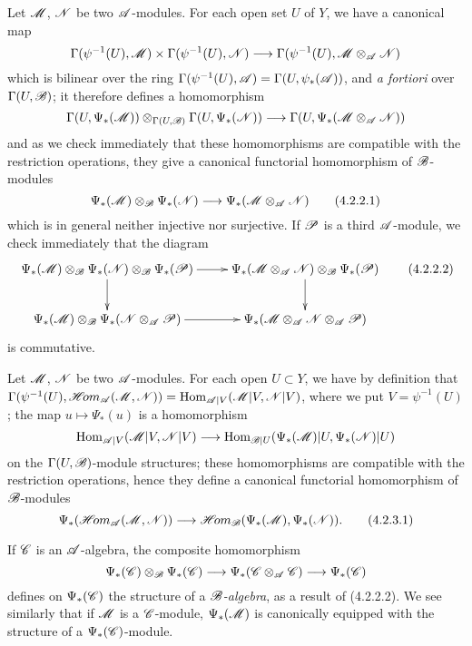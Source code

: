 \begin{env}[4.2.2]
\label{0.4.2.2}
Let $\mathscr{M}$, $\mathscr{N}$ be two $\mathscr{A}$-modules. For each open set $U$ of $Y$, we
have a canonical map
\[
  \Gamma(\psi^{-1}(U),\mathscr{M})\times\Gamma(\psi^{-1}(U),\mathscr{N})
  \longrightarrow\Gamma(\psi^{-1}(U),\mathscr{M}\otimes_\mathscr{A}\mathscr{N})
\]
which is bilinear over the ring
$\Gamma(\psi^{-1}(U),\mathscr{A})=\Gamma(U,\psi_*(\mathscr{A}))$, and \emph{a fortiori}
over $\Gamma(U,\mathscr{B})$; it therefore defines a homomorphism
\[
  \Gamma(U,\Psi_*(\mathscr{M}))\otimes_{\Gamma(U,\mathscr{B})}\Gamma(U,\Psi_*(\mathscr{N}))
  \longrightarrow\Gamma(U,\Psi_*(\mathscr{M}\otimes_\mathscr{A}\mathscr{N}))
\]
and as we check immediately that these homomorphisms are compatible with the
restriction operations, they give a canonical functorial homomorphism of
$\mathscr{B}$-modules
\[
  \Psi_*(\mathscr{M})\otimes_\mathscr{B}\Psi_*(\mathscr{N})
  \longrightarrow\Psi_*(\mathscr{M}\otimes_\mathscr{A}\mathscr{N})
  \tag{4.2.2.1}
\]
which is in general neither injective nor surjective. If $\mathscr{P}$ is a third
$\mathscr{A}$-module, we check immediately that the diagram
\[
  \xymatrix{
    \Psi_*(\sh{M})\otimes_\sh{B}\Psi_*(\sh{N})\otimes_\sh{B}\Psi_*(\sh{P})\ar[r]\ar[d]
    & \Psi_*(\sh{M}\otimes_\sh{A}\sh{N})\otimes_\sh{B}\Psi_*(\sh{P})\ar[d]\\
    \Psi_*(\sh{M})\otimes_\sh{B}\Psi_*(\sh{N}\otimes_\sh{A}\sh{P})\ar[r]
    & \Psi_*(\sh{M}\otimes_\sh{A}\sh{N}\otimes_\sh{A}\sh{P})
  }
  \tag{4.2.2.2}
\]
is commutative.
\end{env}

\begin{env}[4.2.3]
\label{0.4.2.3}
Let $\mathscr{M}$, $\mathscr{N}$ be two $\mathscr{A}$-modules. For each open $U\subset Y$, we
have by definition that
$\Gamma(\psi^{-1}(U),\mathscr{H}\!{om}_\mathscr{A}(\mathscr{M},\mathscr{N}))
  ={\mathop{\mathrm{Hom}}\nolimits}_{\mathscr{A}|V}(\mathscr{M}|V,\mathscr{N}|V)$, where we put $V=\psi^{-1}(U)$; the map
$u\mapsto\Psi_*(u)$ is a homomorphism
\[
  {\mathop{\mathrm{Hom}}\nolimits}_{\mathscr{A}|V}(\mathscr{M}|V,\mathscr{N}|V)
  \longrightarrow{\mathop{\mathrm{Hom}}\nolimits}_{\mathscr{B}|U}(\Psi_*(\mathscr{M})|U,\Psi_*(\mathscr{N})|U)
\]
on the $\Gamma(U,\mathscr{B})$-module structures; these homomorphisms are compatible
with the restriction operations, hence they define a canonical functorial
homomorphism of $\mathscr{B}$-modules
\[
  \Psi_*(\mathscr{H}\!{om}_\mathscr{A}(\mathscr{M},\mathscr{N}))
  \longrightarrow\mathscr{H}\!{om}_\mathscr{B}(\Psi_*(\mathscr{M}),\Psi_*(\mathscr{N})).
  \tag{4.2.3.1}
\]
\end{env}

\begin{env}[4.2.4]
\label{0.4.2.4}
If $\mathscr{C}$ is an $\mathscr{A}$-algebra, the composite homomorphism
\[
  \Psi_*(\mathscr{C})\otimes_\mathscr{B}\Psi_*(\mathscr{C})
  \longrightarrow\Psi_*(\mathscr{C}\otimes_\mathscr{A}\mathscr{C})
  \longrightarrow\Psi_*(\mathscr{C})
\]
defines on $\Psi_*(\mathscr{C})$ the structure of a \emph{$\mathscr{B}$-algebra}, as a
result of (4.2.2.2). We see similarly that if $\mathscr{M}$ is a $\mathscr{C}$-module,
$\Psi_*(\mathscr{M})$ is canonically equipped with the structure of a
$\Psi_*(\mathscr{C})$-module.
\end{env}

